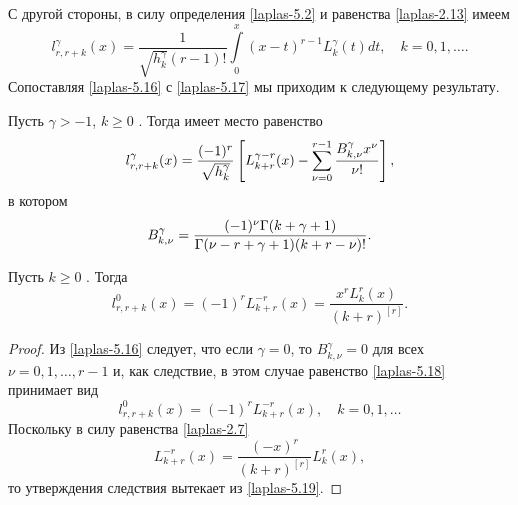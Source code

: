 С другой стороны, в силу определения \eqref{laplas-5.2} и равенства \eqref{laplas-2.13}    имеем
 \begin{equation}\label{laplas-5.17}
l_{r,r+k}^{\gamma}(x) =\frac{1}{\sqrt{h_k^\gamma}(r-1)!}\int\limits_{0}^x(x-t)^{r-1}L_{k}^{\gamma}(t)dt, \quad k=0,1,\ldots.
\end{equation}
 Сопоставляя \eqref{laplas-5.16} с \eqref{laplas-5.17} мы приходим к следующему результату.
\begin{theorem}
Пусть $\gamma>-1$, $k\ge0$ . Тогда имеет место равенство
\begin{equation}\label{laplas-5.18}
l_{r,r+k}^{\gamma}(x)=\frac{(-1)^r}{\sqrt{h_k^\gamma}}\left[L_{k+r}^{\gamma-r}(x)-
     \sum_{\nu=0}^{r-1}
{B_{k,\nu}^\gamma x^\nu\over\nu!}\right],
\end{equation}
в котором
$$
B_{k,\nu}^\gamma={(-1)^\nu\Gamma(k+\gamma+1)\over\Gamma(\nu-r+ \gamma+1)(k+r-\nu)!}.
$$
\end{theorem}

\begin{corollary}\label{laplascor1}
Пусть  $k\ge0$ . Тогда
$$
l_{r,r+k}^{0}(x)=(-1)^rL_{k+r}^{-r}(x)=\frac{x^{r}L_{k}^{r}(x)}{(k+r)^{[r]}}.
$$
\end{corollary}
\begin{proof}
Из \eqref{laplas-5.16} следует, что если $\gamma=0$, то $B_{k,\nu}^\gamma=0$ для всех $\nu=0,1,\ldots, r-1$ и, как следствие, в этом случае равенство \eqref{laplas-5.18} принимает вид
\begin{equation}\label{laplas-5.19}
l_{r,r+k}^{0}(x)=(-1)^rL_{k+r}^{-r}(x),\quad k=0,1,\ldots
\end{equation}
Поскольку в силу равенства \eqref{laplas-2.7}
$$
L_{k+r}^{-r}(x) = \frac{(-x)^{r}}{(k+r)^{[r]}} L_{k}^{r}(x),
$$
то  утверждения следствия вытекает  из \eqref{laplas-5.19}.
\end{proof}

